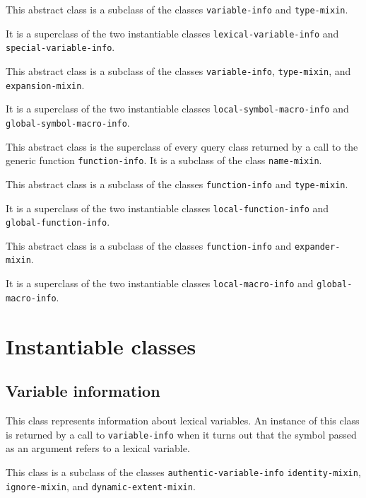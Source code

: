 
This abstract class is a subclass of the classes
\texttt{variable-info} and \texttt{type-mixin}.

It is a superclass of the two instantiable classes
\texttt{lexical-variable-info} and
\texttt{special-variable-info}.


This abstract class is a subclass of the classes
\texttt{variable-info}, \texttt{type-mixin}, and
\texttt{expansion-mixin}.

It is a superclass of the two instantiable classes
\texttt{local-symbol-macro-info} and
\texttt{global-symbol-macro-info}.


This abstract class is the superclass of every query class returned by
a call to the generic function \texttt{function-info}.  It is a
subclass of the class \texttt{name-mixin}.


This abstract class is a subclass of the classes
\texttt{function-info} and \texttt{type-mixin}.

It is a superclass of the two instantiable classes
\texttt{local-function-info} and
\texttt{global-function-info}.


This abstract class is a subclass of the classes
\texttt{function-info} and \texttt{expander-mixin}.

It is a superclass of the two instantiable classes
\texttt{local-macro-info} and
\texttt{global-macro-info}.

\section{Instantiable classes}

\subsection{Variable information}


This class represents information about lexical variables.  An
instance of this class is returned by a call to \texttt{variable-info}
when it turns out that the symbol passed as an argument refers to a
lexical variable.

This class is a subclass of the classes
\texttt{authentic-variable-info} \texttt{identity-mixin},
\texttt{ignore-mixin}, and \texttt{dynamic-extent-mixin}.

